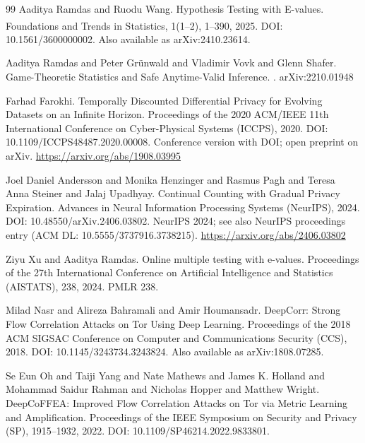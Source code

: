 \documentclass[11pt]{article}
\begin{document}
\begin{thebibliography}{99}
Aaditya Ramdas and Ruodu Wang.
\newblock Hypothesis Testing with {E}-values.
\newblock Foundations and Trends\textsuperscript{\textregistered} in Statistics, 1(1--2), 1--390, 2025.
\newblock DOI: 10.1561/3600000002.
\newblock Also available as arXiv:2410.23614.

Aaditya Ramdas and Peter Gr{\"u}nwald and Vladimir Vovk and Glenn Shafer.
\newblock Game-Theoretic Statistics and Safe Anytime-Valid Inference.
.
\newblock arXiv:2210.01948

Farhad Farokhi.
\newblock Temporally Discounted Differential Privacy for Evolving Datasets on an Infinite Horizon.
\newblock Proceedings of the 2020 ACM/IEEE 11th International Conference on Cyber-Physical Systems (ICCPS), 2020.
\newblock DOI: 10.1109/ICCPS48487.2020.00008.
\newblock Conference version with DOI; open preprint on arXiv.
\newblock \url{https://arxiv.org/abs/1908.03995}

Joel Daniel Andersson and Monika Henzinger and Rasmus Pagh and Teresa Anna Steiner and Jalaj Upadhyay.
\newblock Continual Counting with Gradual Privacy Expiration.
\newblock Advances in Neural Information Processing Systems (NeurIPS), 2024.
\newblock DOI: 10.48550/arXiv.2406.03802.
\newblock NeurIPS 2024; see also NeurIPS proceedings entry (ACM DL: 10.5555/3737916.3738215).
\newblock \url{https://arxiv.org/abs/2406.03802}

Ziyu Xu and Aaditya Ramdas.
\newblock Online multiple testing with e-values.
\newblock Proceedings of the 27th International Conference on Artificial Intelligence and Statistics (AISTATS), 238, 2024.
\newblock PMLR 238.

Milad Nasr and Alireza Bahramali and Amir Houmansadr.
\newblock DeepCorr: Strong Flow Correlation Attacks on Tor Using Deep Learning.
\newblock Proceedings of the 2018 ACM SIGSAC Conference on Computer and Communications Security (CCS), 2018.
\newblock DOI: 10.1145/3243734.3243824.
\newblock Also available as arXiv:1808.07285.

Se Eun Oh and Taiji Yang and Nate Mathews and James K. Holland and Mohammad Saidur Rahman and Nicholas Hopper and Matthew Wright.
\newblock DeepCoFFEA: Improved Flow Correlation Attacks on Tor via Metric Learning and Amplification.
\newblock Proceedings of the IEEE Symposium on Security and Privacy (SP), 1915--1932, 2022.
\newblock DOI: 10.1109/SP46214.2022.9833801.


\end{thebibliography}
\end{document}
